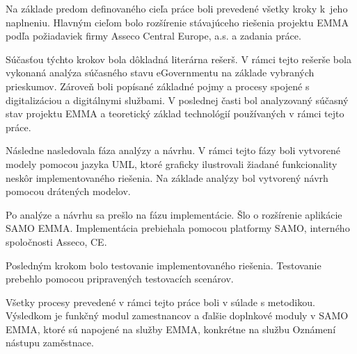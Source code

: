 Na základe predom definovaného cieľa práce boli prevedené všetky kroky k~jeho naplneniu. Hlavným cieľom bolo rozšírenie stávajúceho riešenia projektu EMMA podľa požiadaviek firmy Asseco Central Europe, a.s. a zadania práce.

Súčasťou týchto krokov bola dôkladná literárna rešerš. V rámci tejto rešerše bola vykonaná analýza súčasného stavu eGovernmentu na základe vybraných prieskumov. Zároveň boli popísané základné pojmy a procesy spojené s digitalizáciou a digitálnymi službami. V poslednej časti bol analyzovaný súčasný stav projektu EMMA a teoretický základ technológií používaných v rámci tejto práce.

Následne nasledovala fáza analýzy a návrhu. V rámci tejto fázy boli vytvorené modely pomocou jazyka UML, ktoré graficky ilustrovali žiadané funkcionality neskôr implementovaného riešenia. Na základe analýzy bol vytvorený návrh pomocou drátených modelov.

Po analýze a návrhu sa prešlo na fázu implementácie. Šlo o rozšírenie aplikácie SAMO EMMA. Implementácia prebiehala pomocou platformy SAMO, interného  spoločnosti Asseco, CE. 

Posledným krokom bolo testovanie implementovaného riešenia. Testovanie prebehlo pomocou pripravených testovacích scenárov. 

Všetky procesy prevedené v rámci tejto práce boli v súlade s metodikou. Výsledkom je funkčný modul zamestnancov a ďalšie doplnkové moduly v SAMO EMMA, ktoré sú napojené na služby EMMA, konkrétne na službu Oznámení nástupu zaměstnace.

\bbib




